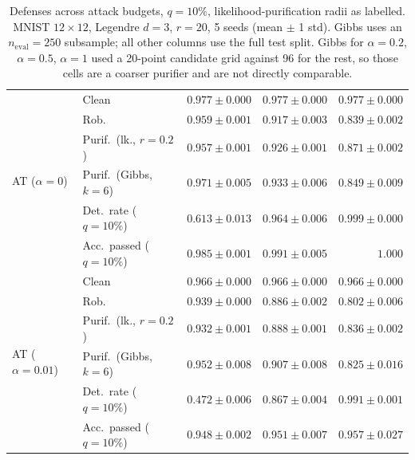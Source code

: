 \begin{table}[htbp]
\begin{tabular}{@{}llrrr@{}}
    \cmidrule(lr){1-5}
    \multirow{6}{*}{AT ($\alpha{=}0$)} & Clean & $0.977 \pm 0.000$ & $0.977 \pm 0.000$ & $0.977 \pm 0.000$ \\
     & Rob. & $\mathbf{0.959 \pm 0.001}$ & $\mathbf{0.917 \pm 0.003}$ & $\mathbf{0.839 \pm 0.002}$ \\
     & Purif.\ (lk., $r{=}0.2$) & $\mathbf{0.957 \pm 0.001}$ & $\mathbf{0.926 \pm 0.001}$ & $\mathbf{0.871 \pm 0.002}$ \\
     & Purif.\ (Gibbs, $k{=}6$) & $\mathbf{0.971 \pm 0.005}$ & $\mathbf{0.933 \pm 0.006}$ & $\mathbf{0.849 \pm 0.009}$ \\
     & Det.\ rate ($q{=}10\%$) & $\mathbf{0.613 \pm 0.013}$ & $\mathbf{0.964 \pm 0.006}$ & $\mathbf{0.999 \pm 0.000}$ \\
     & Acc.\ passed ($q{=}10\%$) & $\mathbf{0.985 \pm 0.001}$ & $\mathbf{0.991 \pm 0.005}$ & $\mathbf{1.000}$ \\
    \cmidrule(lr){1-5}
    \multirow{6}{*}{AT ($\alpha{=}0.01$)} & Clean & $0.966 \pm 0.000$ & $0.966 \pm 0.000$ & $0.966 \pm 0.000$ \\
     & Rob. & $0.939 \pm 0.000$ & $0.886 \pm 0.002$ & $0.802 \pm 0.006$ \\
     & Purif.\ (lk., $r{=}0.2$) & $0.932 \pm 0.001$ & $0.888 \pm 0.001$ & $0.836 \pm 0.002$ \\
     & Purif.\ (Gibbs, $k{=}6$) & $0.952 \pm 0.008$ & $0.907 \pm 0.008$ & $0.825 \pm 0.016$ \\
     & Det.\ rate ($q{=}10\%$) & $0.472 \pm 0.006$ & $0.867 \pm 0.004$ & $0.991 \pm 0.001$ \\
     & Acc.\ passed ($q{=}10\%$) & $0.948 \pm 0.002$ & $0.951 \pm 0.007$ & $0.957 \pm 0.027$ \\
    \bottomrule
  \end{tabular}
  \caption{Defenses across attack budgets, $q{=}10\%$, likelihood-purification radii as labelled. MNIST $12\times12$, Legendre $d{=}3$, $r{=}20$, 5 seeds (mean $\pm$ 1 std). Gibbs uses an $n_{\mathrm{eval}}=250$ subsample; all other columns use the full test split. Gibbs for $\alpha{=}0.2$, $\alpha{=}0.5$, $\alpha{=}1$ used a 20-point candidate grid against 96 for the rest, so those cells are a coarser purifier and are not directly comparable.}
  \label{tab:mnist_r12_models_r20}
\end{table}
